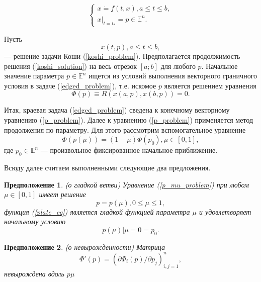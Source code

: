 \begin {equation}
\label {koshi_problem}
\begin{cases} 
x\dot = f(t,x), a\leq t\leq b, \\
x|_{t=t_*}=p\in\mathbb{E}^n.
\end{cases}
\end{equation}

Пусть
\begin{equation}
\label{koshi_solution}
x(t,p),  a\leq t\leq b,
\end{equation}
--- решение задачи Коши (\ref{koshi_problem}). Предполагается продолжимость решения (\ref{koshi_solution}) на весь отрезок $[a; b]$ для любого $p$. Начальное значение параметра $p\in\mathbb{E}^n$ ищется из условий выполнения векторного граничного условия в задаче (\ref{edged_problem}), т.е. искомое $p$ является решением уравнения
\begin{equation}
\label{p_problem}
\Phi(p)\equiv R(x(a,p),x(b,p))=0.
\end{equation}

Итак, краевая задача (\ref{edged_problem}) сведена к конечному векторному
уравнению (\ref{p_problem}). Далее к уравнению (\ref{p_problem}) применяется метод продолжения
по параметру. Для этого рассмотрим вспомогательное уравнение
\begin{equation}
\label{p_mu_problem}
\Phi(p(\mu))=(1-\mu)\Phi(p_0), \mu\in[0,1],
\end{equation}
где $p_0\in\mathbb{E}^n$ --- произвольное фиксированное начальное приближение.

Всюду далее считаем выполненными следующие два предложения.
\newtheorem{proposition}{Предположение}
\renewcommand{\theproposition}{\arabic{proposition}}

\begin{proposition}{(о гладкой ветви)}
Уравнение (\ref{p_mu_problem}) при любом $\mu\in[0,1]$ имеет решение
\begin {equation}
\label{plate_eq}
p=p(\mu), 0\leq\mu\leq1,
\end{equation}
функция (\ref{plate_eq}) является гладкой функцией параметра $\mu$ и удовлетворяет
начальному условию
\begin{equation}
\label{p_mu_start}
p(\mu)|{\mu=0}=p_0.
\end{equation}
\end{proposition}
\begin{proposition}{(о невырожденности)}
Матрица
\begin{equation}
\label{dPhi}
\Phi'(p)=(\partial\Phi_i(p)/\partial p_j)^n_{i,j=1},
\end{equation}
невырождена вдоль $p\mu$
\end{proposition}

